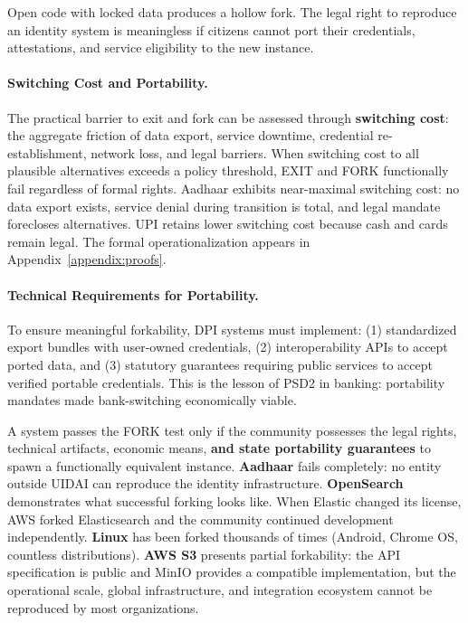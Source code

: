 \documentclass{article}
\begin{document}
Open code with locked data produces a hollow fork. The legal right to reproduce an identity system is meaningless if citizens cannot port their credentials, attestations, and service eligibility to the new instance.

\paragraph{Switching Cost and Portability.} The practical barrier to exit and fork can be assessed through \textbf{switching cost}: the aggregate friction of data export, service downtime, credential re-establishment, network loss, and legal barriers. When switching cost to all plausible alternatives exceeds a policy threshold, EXIT and FORK functionally fail regardless of formal rights. Aadhaar exhibits near-maximal switching cost: no data export exists, service denial during transition is total, and legal mandate forecloses alternatives. UPI retains lower switching cost because cash and cards remain legal. The formal operationalization appears in Appendix~\ref{appendix:proofs}.

\paragraph{Technical Requirements for Portability.} To ensure meaningful forkability, DPI systems must implement: (1) standardized export bundles with user-owned credentials, (2) interoperability APIs to accept ported data, and (3) statutory guarantees requiring public services to accept verified portable credentials. This is the lesson of PSD2 in banking: portability mandates made bank-switching economically viable.

A system passes the FORK test only if the community possesses the legal rights, technical artifacts, economic means, \textbf{and state portability guarantees} to spawn a functionally equivalent instance. \textbf{Aadhaar} fails completely: no entity outside UIDAI can reproduce the identity infrastructure. \textbf{OpenSearch} demonstrates what successful forking looks like. When Elastic changed its license, AWS forked Elasticsearch and the community continued development independently. \textbf{Linux} has been forked thousands of times (Android, Chrome OS, countless distributions). \textbf{AWS S3} presents partial forkability: the API specification is public and MinIO provides a compatible implementation, but the operational scale, global infrastructure, and integration ecosystem cannot be reproduced by most organizations.
\end{document}
